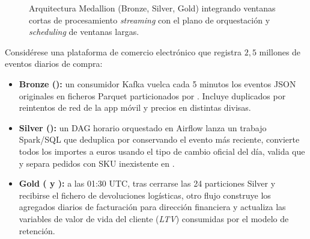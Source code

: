 \begin{figure}[htbp]
{%
}
\caption{Arquitectura Medallion (Bronze, Silver, Gold) integrando ventanas cortas de procesamiento \textit{streaming} con el plano de orquestación y \textit{scheduling} de ventanas largas.}
\label{fig:medallion}
\end{figure}

\begin{examplebox}
Considérese una plataforma de comercio electrónico que registra $2{,}5$ millones de eventos diarios de compra:
\begin{itemize}
  \item \textbf{Bronze ():} un consumidor Kafka vuelca cada 5 minutos los eventos JSON originales en ficheros Parquet particionados por . Incluye duplicados por reintentos de red de la app móvil y precios en distintas divisas.
  \item \textbf{Silver ():} un DAG horario orquestado en Airflow lanza un trabajo Spark/SQL que deduplica por  conservando el evento más reciente, convierte todos los importes a euros usando el tipo de cambio oficial del día, valida que  y separa pedidos con SKU inexistente en .
  \item \textbf{Gold ( y ):} a las 01:30 UTC, tras cerrarse las 24 particiones Silver y recibirse el fichero de devoluciones logísticas, otro flujo construye los agregados diarios de facturación para dirección financiera y actualiza las variables de valor de vida del cliente (\textit{LTV}) consumidas por el modelo de retención.
\end{itemize}
\end{examplebox}

